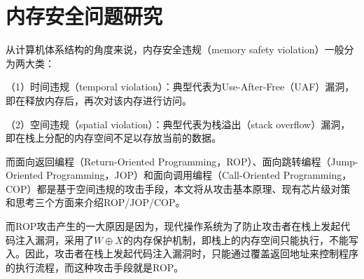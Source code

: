 %
%

\chapter{内存安全问题研究}\label{chap3}

从计算机体系结构的角度来说，内存安全违规（memory safety violation）一般分为两大类：

（1）时间违规（temporal violation）：典型代表为Use-After-Free（UAF）漏洞，即在释放内存后，再次对该内存进行访问。

（2）空间违规（spatial violation）：典型代表为栈溢出（stack overflow）漏洞，即在栈上分配的内存空间不足以存放当前的数据。

而面向返回编程（Return-Oriented Programming，ROP）、面向跳转编程（Jump-Oriented Programming，JOP）和面向调用编程（Call-Oriented Programming，COP）都是基于空间违规的攻击手段，本文将从攻击基本原理、现有芯片级对策和思考三个方面来介绍ROP/JOP/COP。

而ROP攻击产生的一大原因是因为，现代操作系统为了防止攻击者在栈上发起代码注入漏洞，采用了$W \oplus X$的内存保护机制，即栈上的内存空间只能执行，不能写入。因此，攻击者在栈上发起代码注入漏洞时，只能通过覆盖返回地址来控制程序的执行流程，而这种攻击手段就是ROP。